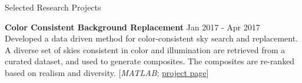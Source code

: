 \documentclass{resume} %
\begin{document}
\begin{rSection}{Selected Research Projects}
\item \textbf{Color Consistent Background Replacement} \hfill Jan 2017 - Apr 2017\\
Developed a data driven method for color-consistent sky search and replacement. A diverse set of skies consistent in color and illumination are retrieved from a curated dataset, and used to generate composites. The composites are re-ranked based on realism and diversity. [\textit{MATLAB}; \href{https://cvit.iiit.ac.in/research/projects/cvit-projects/findmeasky}{project page}] %





\end{rSection}
\end{document}
